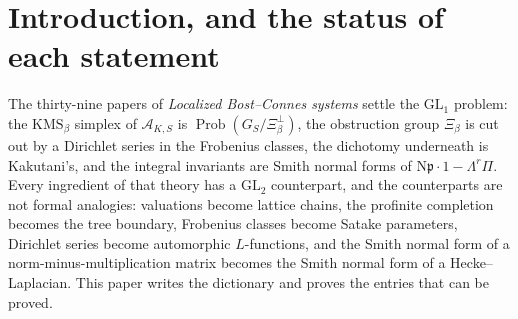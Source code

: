 \documentclass[11pt]{amsart}
\numberwithin{equation}{section}
\theoremstyle{definition}
\theoremstyle{remark}
\newcommand{\Z}{\mathbb{Z}}
\newcommand{\F}{\mathbb{F}}
\newcommand{\cA}{\mathcal{A}}
\newcommand{\pp}{\mathfrak{p}}
\newcommand{\Ns}{\mathrm{N}}
\newcommand{\Prob}{\operatorname{Prob}}
\newcommand{\Tors}{\operatorname{Tors}}
\newcommand{\Jac}{\operatorname{Jac}}
\newcommand{\KMS}{\mathrm{KMS}}
\newcommand{\GL}{\mathrm{GL}}
\begin{document}
\begin{abstract}
Section~\ref{sec:ktheory} is the algorithmic bridge, and it is where the higher-weight
arithmetic survives. Pimsner's exact sequence for the Hecke correspondence, the
non-commutative replacement of the equivariant Pimsner--Voiculescu sequence, identifies
$K_*$ with the kernel and cokernel of $1-u\,T_p+qu^2$ over $\Z[u^{\pm1}]$ --- the
\emph{Ihara module}, whose Fitting ideal is the Ihara zeta function by Bass's identity.
Specializing $u=1$ gives the Hecke--Laplacian $\Delta_p=(q+1)I-T_p$ and the structure
theorem
\[
K_0\cong\Z\oplus\Jac(Y),\qquad K_1\cong\Z,\qquad
|\Jac(Y)|=\frac1{|V|}\prod_f\bigl(p+1-a_p(f)\bigr)=\frac1{|V|}\prod_f\#E_f(\F_p),
\]
the torsion being computed exactly, as a group and not merely as an order, by the Smith
normal form of $\Delta_p$: Frobenius traces precipitate as $K$-theoretic torsion. By
contrast the boundary crossed product is arithmetically blind,
$K_0(C(\partial X)\rtimes\Gamma)\cong\Z^r\oplus\Z/(r-1)$ with $r$ the rank of $\Gamma$,
a theorem proved here by collapsing the reversal relation
$[f]+[\bar f]=c_{o(f)}$ to a single class of order $|E_Y|-|V_Y|$. Eleven independent
machine computations confirm both channels. Along Benjamini--Schramm convergent families
the torsion density converges exactly to Lyons' tree entropy,
$\frac1n\log|\Tors K_0|\to q\log q-\frac{q-1}2\log(q^2-1)$, and the Ramanujan bound
$2\log(1+\sqrt q)$, while unconditional, is strict and exceeds it by
$2q^{-1/2}+O(q^{-1})$ as $q\to\infty$ --- a Taylor expansion, not a fit --- because it
replaces a Kesten--McKay integral by its spectral edge. The Laplacian channel is realised as a
$\Z[u^{\pm1}]$-module and as the index of a Hecke--Dirac operator, not as a
$C^*$-algebra: the class $T_p-qI$ is a legitimate $KK$-class but not a correspondence,
and closing that gap is the paper's main open problem.
\end{abstract}

\maketitle

\section*{Introduction, and the status of each statement}

The thirty-nine papers of \emph{Localized Bost--Connes systems} settle the
$\GL_1$ problem: the $\KMS_\beta$ simplex of $\cA_{K,S}$ is $\Prob(G_S/\Xi_\beta^\perp)$,
the obstruction group $\Xi_\beta$ is cut out by a Dirichlet series in the Frobenius
classes, the dichotomy underneath is Kakutani's, and the integral invariants are Smith
normal forms of $\Ns\pp\cdot 1-\Lambda^r\Pi$. Every ingredient of that theory has a
$\GL_2$ counterpart, and the counterparts are not formal analogies: valuations become
lattice chains, the profinite completion becomes the tree boundary, Frobenius classes
become Satake parameters, Dirichlet series become automorphic $L$-functions, and the
Smith normal form of a norm-minus-multiplication matrix becomes the Smith normal form of
a Hecke--Laplacian. This paper writes the dictionary and proves the entries that can be
proved.
\end{document}
